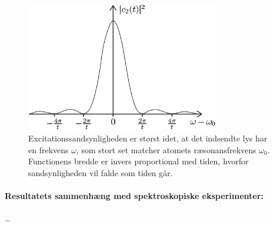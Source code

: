 \begin{figure}[!h]
    \centering
    \includegraphics[width=0.75\textwidth]{Q03/images/ExcitationProbabilityFunction.PNG}
    \caption{Excitationssandsynligheden er størst idet, at det indsendte lys har en frekvens $\omega$, som stort set matcher atomets ræsonansfrekvens $\omega_0$. Functionens bredde er invers proportional med tiden, hvorfor sandsynligheden vil falde som tiden går.}
    \label{fig:Q03_ExcitationProbabilityFunction}
\end{figure}


\paragraph{Resultatets sammenhæng med spektroskopiske eksperimenter:} \ldots